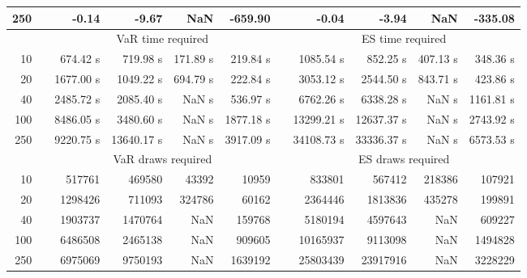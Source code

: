 {{\begin{longtable}{rr rrrr r rrrr}
250 && -0.14 & -9.67 &  NaN & -659.90 && -0.04 & -3.94 &  NaN & -335.08 \\ 
\hline 
 & & \multicolumn{4}{c}{VaR time required} && \multicolumn{4}{c}{ES time required} \\ \cline{3-6}  \cline{8-11}
10 & & 674.42 s & 719.98 s & 171.89 s & 219.84 s && 1085.54 s & 852.25 s & 407.13 s & 348.36 s \\ 
20 & & 1677.00 s & 1049.22 s & 694.79 s & 222.84 s && 3053.12 s & 2544.50 s & 843.71 s & 423.86 s \\ 
40 & & 2485.72 s & 2085.40 s &  NaN s & 536.97 s && 6762.26 s & 6338.28 s &  NaN s & 1161.81 s \\ 
100 & & 8486.05 s & 3480.60 s &  NaN s & 1877.18 s && 13299.21 s & 12637.37 s &  NaN s & 2743.92 s \\ 
250 & & 9220.75 s & 13640.17 s &  NaN s & 3917.09 s && 34108.73 s & 33336.37 s &  NaN s & 6573.53 s \\ 
\hline 
 && \multicolumn{4}{c}{VaR draws required} &&   \multicolumn{4}{c}{ES draws required} \\  \cline{3-6}  \cline{8-11} 
10 & & 517761 & 469580 & 43392 & 10959 && 833801 & 567412 & 218386  & 107921 \\ 
20 & & 1298426 & 711093 & 324786 & 60162 && 2364446 & 1813836 & 435278  & 199891 \\ 
40 & & 1903737 & 1470764 & NaN & 159768 && 5180194 & 4597643 & NaN  & 609227 \\ 
100 & & 6486508 & 2465138 & NaN & 909605 && 10165937 & 9113098 & NaN  & 1494828 \\ 
250 & & 6975069 & 9750193 & NaN & 1639192 && 25803439 & 23917916 & NaN  & 3228229 \\ 
\hline 
\end{longtable} 
} 
} 
